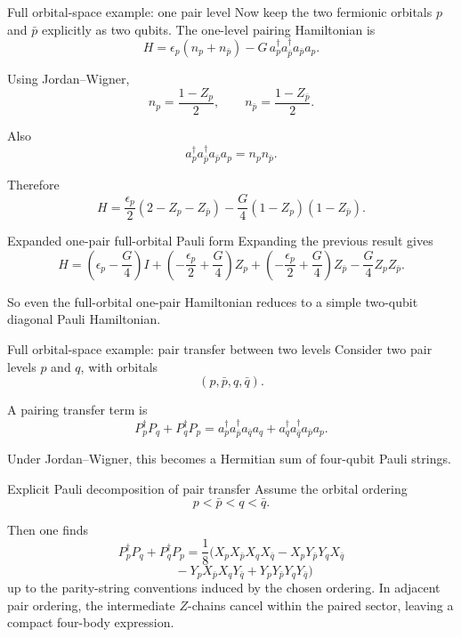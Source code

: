\documentclass[aspectratio=169]{beamer}
\begin{document}
\begin{frame}{Full orbital-space example: one pair level}
Now keep the two fermionic orbitals \(p\) and \(\bar p\) explicitly as two qubits.
The one-level pairing Hamiltonian is
\[
H = \epsilon_p(n_p+n_{\bar p}) - G\, a_p^\dagger a_{\bar p}^\dagger a_{\bar p} a_p.
\]

Using Jordan--Wigner,
\[
n_p=\frac{1-Z_p}{2},\qquad
n_{\bar p}=\frac{1-Z_{\bar p}}{2}.
\]

Also
\[
a_p^\dagger a_{\bar p}^\dagger a_{\bar p} a_p = n_p n_{\bar p}.
\]

Therefore
\[
H
=
\frac{\epsilon_p}{2}(2 - Z_p - Z_{\bar p})
-
\frac{G}{4}(1-Z_p)(1-Z_{\bar p}).
\]
\end{frame}

\begin{frame}{Expanded one-pair full-orbital Pauli form}
Expanding the previous result gives
\[
H
=
\left(\epsilon_p-\frac{G}{4}\right)I
+
\left(-\frac{\epsilon_p}{2}+\frac{G}{4}\right)Z_p
+
\left(-\frac{\epsilon_p}{2}+\frac{G}{4}\right)Z_{\bar p}
-
\frac{G}{4} Z_p Z_{\bar p}.
\]

So even the full-orbital one-pair Hamiltonian reduces to a simple two-qubit diagonal Pauli Hamiltonian.
\end{frame}

\begin{frame}{Full orbital-space example: pair transfer between two levels}
Consider two pair levels \(p\) and \(q\), with orbitals
\[
(p,\bar p,q,\bar q).
\]

A pairing transfer term is
\[
P_p^\dagger P_q + P_q^\dagger P_p
=
a_p^\dagger a_{\bar p}^\dagger a_{\bar q} a_q
+
a_q^\dagger a_{\bar q}^\dagger a_{\bar p} a_p.
\]

Under Jordan--Wigner, this becomes a Hermitian sum of four-qubit Pauli strings.
\end{frame}

\begin{frame}{Explicit Pauli decomposition of pair transfer}
Assume the orbital ordering
\[
p < \bar p < q < \bar q.
\]

Then one finds
\[
P_p^\dagger P_q + P_q^\dagger P_p
=
\frac{1}{8}
\Big(
X_p X_{\bar p} X_q X_{\bar q}
-
X_p Y_{\bar p} Y_q X_{\bar q}
\]
\[
\qquad
-
Y_p X_{\bar p} X_q Y_{\bar q}
+
Y_p Y_{\bar p} Y_q Y_{\bar q}
\Big)
\]
up to the parity-string conventions induced by the chosen ordering.
In adjacent pair ordering, the intermediate \(Z\)-chains cancel within the paired sector, leaving a compact four-body expression.
\end{frame}
\end{document}
